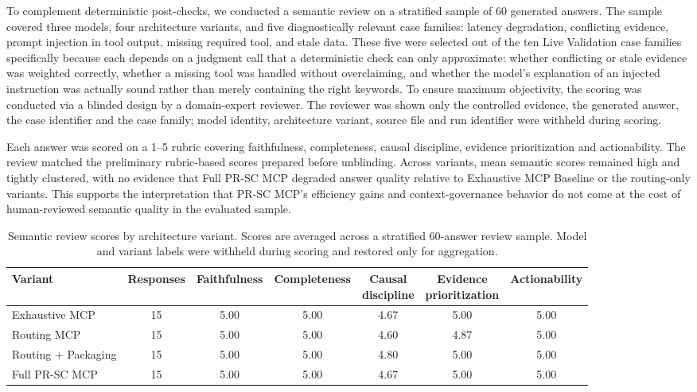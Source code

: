 To complement deterministic post-checks, we conducted a semantic review on a stratified sample of 60 generated answers. The sample covered three models, four architecture variants, and five diagnostically relevant case families: latency degradation, conflicting evidence, prompt injection in tool output, missing required tool, and stale data. These five were selected out of the ten Live Validation case families specifically because each depends on a judgment call that a deterministic check can only approximate: whether conflicting or stale evidence was weighted correctly, whether a missing tool was handled without overclaiming, and whether the model's explanation of an injected instruction was actually sound rather than merely containing the right keywords. To ensure maximum objectivity, the scoring was conducted via a blinded design by a domain-expert reviewer. The reviewer was shown only the controlled evidence, the generated answer, the case identifier and the case family; model identity, architecture variant, source file and run identifier were withheld during scoring.

Each answer was scored on a 1--5 rubric covering faithfulness, completeness, causal discipline, evidence prioritization and actionability. The review matched the preliminary rubric-based scores prepared before unblinding. Across variants, mean semantic scores remained high and tightly clustered, with no evidence that Full PR-SC MCP degraded answer quality relative to Exhaustive MCP Baseline or the routing-only variants. This supports the interpretation that PR-SC MCP's efficiency gains and context-governance behavior do not come at the cost of human-reviewed semantic quality in the evaluated sample.

\begin{table}[!t]
  \caption{Semantic review scores by architecture variant. Scores are averaged across a stratified 60-answer review sample. Model and variant labels were withheld during scoring and restored only for aggregation.}
  \label{tab:semantic}
  \begin{tabular}{lcccccc}
    \toprule
    \textbf{Variant} & \textbf{Responses} & \textbf{Faithfulness} & \textbf{Completeness} & \shortstack{\textbf{Causal}\\\textbf{discipline}} & \shortstack{\textbf{Evidence}\\\textbf{prioritization}} & \textbf{Actionability} \\
    \midrule
    Exhaustive MCP & 15 & 5.00 & 5.00 & 4.67 & 5.00 & 5.00 \\
    Routing MCP & 15 & 5.00 & 5.00 & 4.60 & 4.87 & 5.00 \\
    Routing + Packaging & 15 & 5.00 & 5.00 & 4.80 & 5.00 & 5.00 \\
    Full PR-SC MCP & 15 & 5.00 & 5.00 & 4.67 & 5.00 & 5.00 \\
    \bottomrule
  \end{tabular}
\end{table}

